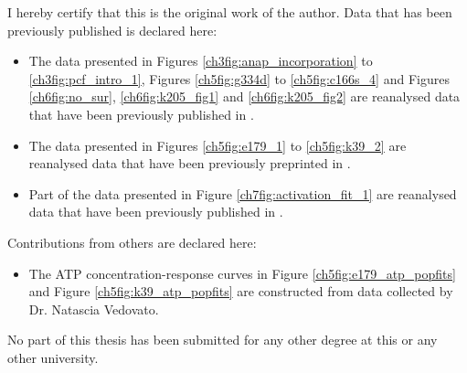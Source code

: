 I hereby certify that this is the original work of the author.
Data that has been previously published is declared here:
\begin{itemize}
\item The data presented in Figures \ref{ch3fig:anap_incorporation} to \ref{ch3fig:pcf_intro_1}, Figures \ref{ch5fig:g334d} to \ref{ch5fig:c166s_4} and Figures \ref{ch6fig:no_sur}, \ref{ch6fig:k205_fig1} and \ref{ch6fig:k205_fig2} are reanalysed data that have been previously published in \textcite{usher_nucleotide_2020}.
\item The data presented in Figures \ref{ch5fig:e179_1} to \ref{ch5fig:k39_2} are reanalysed data that have been previously preprinted in \textcite{pipatpolkai_dynamic_2021}.
\item Part of the data presented in Figure \ref{ch7fig:activation_fit_1} are reanalysed data that have been previously published in \textcite{puljung_activation_2019-1}.
\end{itemize}
Contributions from others are declared here:
\begin{itemize}
\item The ATP concentration-response curves in Figure \ref{ch5fig:e179_atp_popfits} and Figure \ref{ch5fig:k39_atp_popfits} are constructed from data collected by Dr. Natascia Vedovato.
\end{itemize}

No part of this thesis has been submitted for any other degree at this or any other university.